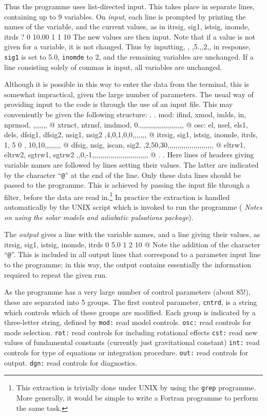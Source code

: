 Thus the programme uses list-directed input.
This takes place in separate
lines, containing up to 9 variables.
On {\it input}, each line is prompted by printing
the names of the variable, and the current values,
as in
\ms
{
\source
itrsig, sig1, istsig, inomde, itrds ?
0 10.00 1 1 10 
}\msni
The new values are then input.
Note that if a value is not given for a variable, it is
not changed.
Thus by inputting, {\eg},
\ms
{
\source
,5.,,2,,
}\msni
in response, {\tt sig1} is set to 5.0, {\tt inomde} to 2, and the
remaining variables are unchanged.
If a line consisting solely of commas is input, all variables are unchanged.

Although it is possible in this way to enter the data from the terminal,
this is somewhat impractical, given the large number of parameters.
The usual way of providing input to the code is through the use
of an input file.
This may conveniently be given the following structure:
\ms
{
\source
\qquad .
\qquad .
mod:
  ifind, xmod, imlds, in, nprmod,
,,,,,,,   @
  xtrnct, ntrnsf, imdmod,
0.,,,,,,,,,,,,,,,,,,,,,, @
osc:
  el, nsel, els1, dels, dfsig1, dfsig2, nsig1, nsig2
   ,4,0,1,0,0,,,,,,,     @
  itrsig, sig1, istsig, inomde, itrds,
    1, 5   0 ,    10,10,,,,,,,,   @
  dfsig, nsig, iscan, sig2,
,2,50,30,,,,,,,,,,,,,,,,,,,,,,,     @
eltrw1, eltrw2, sgtrw1, sgtrw2
,,0,-1,,,,,,,,,,,,,,,,,,,,,,,,,,,,  @
\qquad .
\qquad .
}
\msni
Here lines of headers giving variable names are followed by lines
setting their values.
The latter are indicated by the character ``{\tt @}'' at the end of the line.
Only these data lines should be passed to the programme.
This is achieved by passing the input file through a filter,
before the data are read in.\footnote*
{This extraction is trivially done under UNIX by using
the {\tt grep} programme.
More generally, it would be simple to write a Fortran programme
to perform the same task.
}
In practice the extraction is handled automatically by the
UNIX script which is invoked to run the programme
({\cf} {\it Notes on using the solar models and adiabatic pulsations package}).

The {\it output} gives a line with the variable names,
and a line giving their values, as
\ms
{
\source
itrsig, sig1, istsig, inomde, itrds
0 5.0 1 2 10    @
}\msni
Note the addition of the character ``{\tt @}''.
This is included in all output lines that correspond
to a parameter input line to the programme;
in this way, the output contains essentially the information
required to repeat the given run.

As the programme has a very large number of control
parameters (about 85!), these are separated into 5
groups.
The first control parameter, {\tt cntrd}, is a string which
controls which of these groups are modified.
Each group is indicated by a three-letter string, defined by
\medskip
{\obeylines\smallskip
{\tt mod:} read model controls.
{\tt osc:} read controls for mode selection.
{\tt rot:} read controls for including rotational effects
{\tt cst:} read new values of fundamental constants (currently %
just gravitational constant)
{\tt int:} read controls for type of equations or integration procedure.
{\tt out:} read controls for output.
{\tt dgn:} read controls for diagnostics.}
\bigskip

